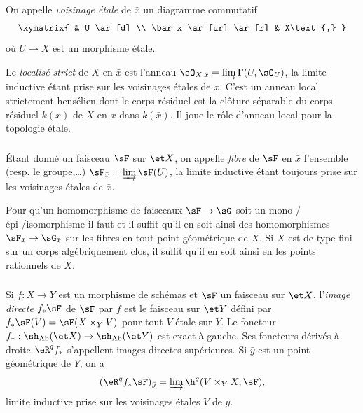 On appelle \emph{voisinage étale} de $\bar x$ un diagramme commutatif 
\[\xymatrix{
  & U \ar[d] \\
  \bar x \ar[ur] \ar[r] 
  & X\text{,}
}\]
où $U\to X$ est un morphisme étale. 

Le \emph{localisé strict} de $X$ en $\bar x$ est l'anneau 
$\sO_{X,\bar x} = \varinjlim \Gamma(U,\sO_U)$, la limite inductive étant prise sur les 
voisinages étales de $\bar x$. C'est un anneau local strictement hensélien dont 
le corps résiduel est la clôture séparable du corps résiduel $k(x)$ de $X$ en 
$x$ dans $k(\bar x)$. Il joue le rôle d'anneau local pour la topologie étale. 





\subsubsection{}\label{I:2-3-2}

Étant donné un faisceau $\sF$ sur $\et X$, on appelle \emph{fibre} de $\sF$ en 
$\bar x$ l'ensemble (resp. le groupe,\dots) $\sF_{\bar x}=\varinjlim \sF(U)$, 
la limite inductive étant toujours prise sur les voisinages étales de $\bar x$. 

Pour qu'un homomorphisme de faisceaux $\sF\to \sG$ soit un 
mono-/épi-/isomorphisme il faut et il suffit qu'il en soit ainsi des homomorphismes 
$\sF_{\bar x}\to \sG_{\bar x}$  sur les fibres en tout point géométrique 
de $X$. Si $X$ est de type fini sur un corps algébriquement clos, il suffit 
qu'il en soit ainsi en les points rationnels de $X$. 





\subsubsection{}\label{I:2-3-3}

Si $f:X\to Y$ est un morphisme de schémas et $\sF$ un faisceau sur $\et X$, 
l'\emph{image directe} $f_* \sF$ de $\sF$ par $f$ est le faisceau sur $\et Y$ 
défini par $f_* \sF(V) = \sF(X\times_Y V)$ pour tout $V$ étale sur $Y$. Le foncteur 
$f_*:\sh_{\mathrm{Ab}}(\et X)\to \sh_{\mathrm{Ab}}(\et Y)$ est exact à gauche. Ses foncteurs 
dérivés à droite $\eR^q f_*$ s'appellent images directes supérieures. Si 
$\bar y$ est un point géométrique de $Y$, on a 
\[
  (\eR^q f_* \sF)_{\bar y} = \varinjlim \h^q(V\times_Y X,\sF)\text{,}
\]
limite inductive prise sur les voisinages étales $V$ de $\bar y$. 

